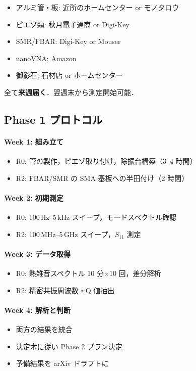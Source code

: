 \documentclass[11pt,a4paper]{article}
\begin{document}
\begin{itemize}
\item アルミ管・板: 近所のホームセンター or モノタロウ
\item ピエゾ類: 秋月電子通商 or Digi-Key
\item SMR/FBAR: Digi-Key or Mouser
\item nanoVNA: Amazon
\item 御影石: 石材店 or ホームセンター
\end{itemize}

全て\textbf{来週届く}．翌週末から測定開始可能．

\subsection{Phase 1 プロトコル}

\paragraph{Week 1: 組み立て}
\begin{itemize}
\item R0: 管の製作，ピエゾ取り付け，除振台構築（3--4 時間）
\item R2: FBAR/SMR の SMA 基板への半田付け（2 時間）
\end{itemize}

\paragraph{Week 2: 初期測定}
\begin{itemize}
\item R0: 100\,Hz--5\,kHz スイープ，モードスペクトル確認
\item R2: 100\,MHz--5\,GHz スイープ，$S_{11}$ 測定
\end{itemize}

\paragraph{Week 3: データ取得}
\begin{itemize}
\item R0: 熱雑音スペクトル 10 分×10 回，差分解析
\item R2: 精密共振周波数・Q 値抽出
\end{itemize}

\paragraph{Week 4: 解析と判断}
\begin{itemize}
\item 両方の結果を統合
\item 決定木に従い Phase 2 プラン決定
\item 予備結果を arXiv ドラフトに
\end{itemize}
\end{document}
